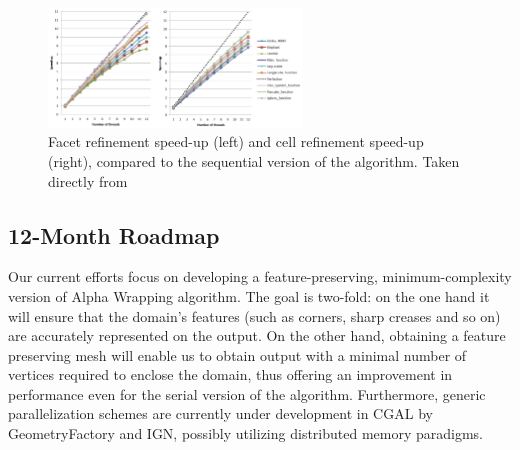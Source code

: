 \begin{figure}[htb]
    \centering
    \includegraphics[width=0.6\textwidth]{graphics/cgal/refinement_speedup.png} 
    \caption{Facet refinement speed-up (left) and cell refinement speed-up (right), compared to the sequential version of the algorithm. Taken directly from \cite{alliez_3d_2024}}
    \label{WP1::CGAL::mg3parallel}
\end{figure}


\subsection{12-Month Roadmap}
\label{sec:WP1:CGAL:roadmap}



Our current efforts focus on developing a feature-preserving, minimum-complexity version of Alpha Wrapping algorithm.
The goal is two-fold: on the one hand it will ensure that the domain's features (such as corners, sharp creases and so on) are accurately represented
on the output. On the other hand, obtaining a feature preserving mesh will enable us to obtain output with a minimal number of vertices
required to enclose the domain, thus offering an improvement in performance even for the serial version of the algorithm. 
Furthermore, generic parallelization schemes are currently under development in CGAL by GeometryFactory and IGN,
possibly utilizing distributed memory paradigms. 



